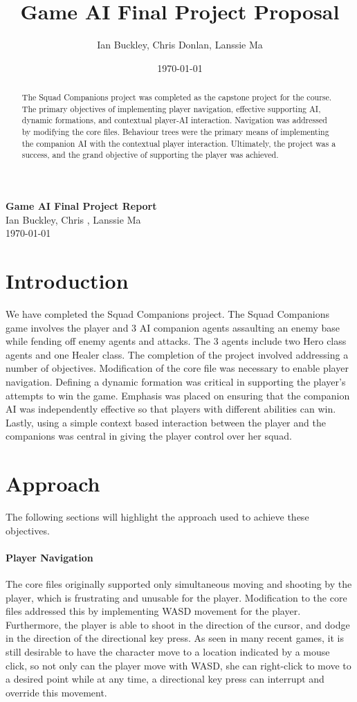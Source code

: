 \documentclass[11pt]{article}
\title{Game AI Final Project Proposal}
\author{Ian Buckley, Chris Donlan, Lanssie Ma}
\date{\today}
\begin{document}
\begin{center}
\textbf{Game AI Final Project Report}\\
Ian Buckley, Chris , Lanssie Ma\\
\today
\end{center}
\begin{abstract}
The Squad Companions project was completed as the capstone project for the course. The primary objectives of implementing player navigation, effective supporting AI, dynamic formations, and contextual player-AI interaction. Navigation was addressed by modifying the core files. Behaviour trees were the primary means of implementing the companion AI with the contextual player interaction. Ultimately, the project was a success, and the grand objective of supporting the player was achieved.
\end{abstract}
\section{Introduction}
We have completed the Squad Companions project. The Squad Companions game involves the player and 3 AI companion agents assaulting an enemy base while fending off enemy agents and attacks. The 3 agents include two Hero class agents and one Healer class. The completion of the project involved addressing a number of objectives. Modification of the core file was necessary to enable player navigation. Defining a dynamic formation was critical in supporting the player's attempts to win the game. Emphasis was placed on ensuring that the companion AI was independently effective so that players with different abilities can win. Lastly, using a simple context based interaction between the player and the companions was central in giving the player control over her squad. 

\section{Approach}
The following sections will highlight the approach used to achieve these objectives.

\paragraph{Player Navigation}
The core files originally supported only simultaneous moving and shooting by the player, which is frustrating and unusable for the player. Modification to the core files addressed this by implementing WASD movement for the player. Furthermore, the player is able to shoot in the direction of the cursor, and dodge in the direction of the directional key press. As seen in many recent games, it is still desirable to have the character move to a location indicated by a mouse click, so not only can the player move with WASD, she can right-click to move to a desired point while at any time, a directional key press can interrupt and override this movement.
\end{document}
